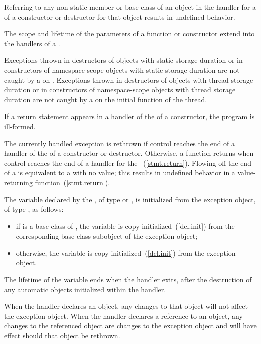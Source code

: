 \pnum
Referring to any non-static member or base class of an object
in the handler for a
of a constructor or destructor for that object results in undefined behavior.

\pnum
The scope and lifetime of the parameters of a function or constructor
extend into the handlers of a
.

\pnum
Exceptions thrown in destructors of objects with static storage duration or in
constructors of namespace-scope objects with static storage duration are not caught by a
on
. Exceptions thrown in destructors of objects with thread storage duration or in constructors of namespace-scope objects with thread storage duration are not caught by a
on the initial function of the thread.

\pnum
If a return statement appears in a handler of the
of a
constructor, the program is ill-formed.

\pnum
The currently handled exception
is rethrown if control reaches the end of a handler of the
of a constructor or destructor.
Otherwise, a
function returns when control reaches the end of a handler for
the
~(\ref{stmt.return}).
Flowing off the end of a
is equivalent to a
with no value;
this results in undefined behavior in a value-returning function~(\ref{stmt.return}).

\pnum
The variable declared by the , of type
\cv{}  or \cv{} , is initialized from the exception object,
of type , as follows:

\begin{itemize}
\item
if  is a base class of , the variable is
copy-initialized~(\ref{dcl.init}) from the corresponding base class subobject
of the exception object;
\item otherwise, the variable is copy-initialized~(\ref{dcl.init})
from the exception object.
\end{itemize}

The lifetime of the variable ends
when the handler exits, after the
destruction of any automatic objects initialized
within the handler.

\pnum
When the handler declares an object,
any changes to that object will not affect the exception object.
When the handler declares a reference to an object,
any changes to the referenced object are changes to the
exception object and will have effect should that object be rethrown.%
%

